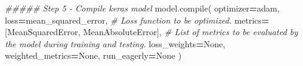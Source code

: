 \documentclass[
  a4paper,
  DIV=11,
  numbers=noendperiod]{scrreprt}
\newenvironment{Shaded}{\begin{snugshade}}{\end{snugshade}}
\newcommand{\BuiltInTok}[1]{#1}
\newcommand{\CommentTok}[1]{\textcolor[rgb]{0.56,0.35,0.01}{\textit{#1}}}
\newcommand{\NormalTok}[1]{#1}
\newcommand{\OperatorTok}[1]{\textcolor[rgb]{0.81,0.36,0.00}{\textbf{#1}}}
\newcommand{\StringTok}[1]{\textcolor[rgb]{0.31,0.60,0.02}{#1}}
\newcommand{\VariableTok}[1]{\textcolor[rgb]{0.00,0.00,0.00}{#1}}
\begin{document}
\begin{Shaded}
\begin{Highlighting}[numbers=left,,]
\CommentTok{\#\#\#\#\# Step 5 {-} Compile keras model}
\NormalTok{model.}\BuiltInTok{compile}\NormalTok{(}
\NormalTok{    optimizer}\OperatorTok{=}\StringTok{\textquotesingle{}adam\textquotesingle{}}\NormalTok{,}
\NormalTok{    loss}\OperatorTok{=}\StringTok{\textquotesingle{}mean\_squared\_error\textquotesingle{}}\NormalTok{, }\CommentTok{\# Loss function to be optimized.}
\NormalTok{    metrics}\OperatorTok{=}\NormalTok{[}\StringTok{\textquotesingle{}MeanSquaredError\textquotesingle{}}\NormalTok{, }\StringTok{\textquotesingle{}MeanAbsoluteError\textquotesingle{}}\NormalTok{], }\CommentTok{\# List of metrics to be evaluated by the model during training and testing.}
\NormalTok{    loss\_weights}\OperatorTok{=}\VariableTok{None}\NormalTok{,}
\NormalTok{    weighted\_metrics}\OperatorTok{=}\VariableTok{None}\NormalTok{,}
\NormalTok{    run\_eagerly}\OperatorTok{=}\VariableTok{None}
\NormalTok{)}



\end{Highlighting}
\end{Shaded}
\end{document}
